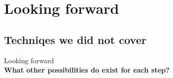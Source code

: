 \documentclass{beamer}
\begin{document}
%
%		
%		
%		
%		
%	
%
%



\section{Looking forward}
\subsection{Techniqes we did not cover}
\begin{frame}[plain]{}
Looking forward\\
\textbf{What other possibilities do exist for each step?}
\end{frame}
\end{document}

